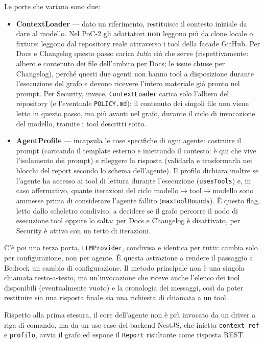 \documentclass[11pt,a4paper]{article}
\begin{document}
Le porte che variano sono due:
\begin{itemize}
  \item \textbf{ContextLoader} --- dato un riferimento, restituisce il contesto iniziale da dare al modello. Nel PoC-2 gli adattatori \textbf{non} leggono più da clone locale o fixture: leggono dal repository reale attraverso i tool della facade GitHub. Per Docs e Changelog questo passo carica \emph{tutto} ciò che serve (rispettivamente: albero e contenuto dei file dell'ambito per Docs; le issue chiuse per Changelog), perché questi due agenti non hanno tool a disposizione durante l'esecuzione del grafo e devono ricevere l'intero materiale già pronto nel prompt. Per Security, invece, \texttt{ContextLoader} carica solo l'albero del repository (e l'eventuale \texttt{POLICY.md}): il contenuto dei singoli file non viene letto in questo passo, ma più avanti nel grafo, durante il ciclo di invocazione del modello, tramite i tool descritti sotto.
  \item \textbf{AgentProfile} --- incapsula le cose specifiche di ogni agente: costruire il prompt (caricando il template esterno e iniettando il contesto: è qui che vive l'isolamento dei prompt) e rileggere la risposta (validarla e trasformarla nei blocchi del report secondo lo schema dell'agente). Il profilo dichiara inoltre se l'agente ha accesso ai tool di lettura durante l'esecuzione (\texttt{usesTools}) e, in caso affermativo, quante iterazioni del ciclo modello$\to$tool$\to$modello sono ammesse prima di considerare l'agente fallito (\texttt{maxToolRounds}). È questo flag, letto dallo scheletro condiviso, a decidere se il grafo percorre il nodo di esecuzione tool oppure lo salta: per Docs e Changelog è disattivato, per Security è attivo con un tetto di iterazioni.
\end{itemize}

C'è poi una terza porta, \texttt{LLMProvider}, condivisa e identica per tutti: cambia solo per configurazione, non per agente. È questa astrazione a rendere il passaggio a Bedrock un cambio di configurazione. Il metodo principale non è una singola chiamata testo-a-testo, ma un'invocazione che riceve anche l'elenco dei tool disponibili (eventualmente vuoto) e la cronologia dei messaggi, così da poter restituire sia una risposta finale sia una richiesta di chiamata a un tool.

Rispetto alla prima stesura, il core dell'agente non è più invocato da un driver a riga di comando, ma da un use case del backend NestJS, che inietta \texttt{context\_ref} e \texttt{profilo}, avvia il grafo ed espone il \texttt{Report} risultante come risposta REST.
\end{document}
